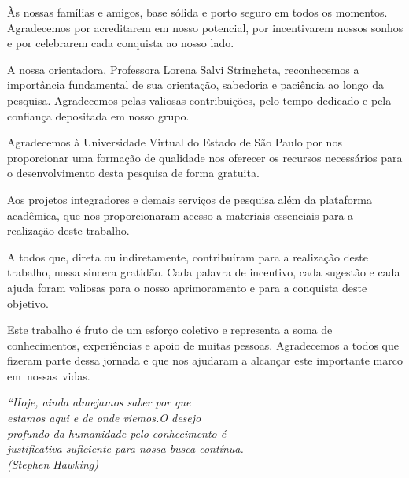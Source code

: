\documentclass[
12pt,
 a4paper,
    english,
    brazil,
    oneside
    ]{abntex2}
\begin{document}
	\begin{agradecimentos}
		Às nossas famílias e amigos, base sólida e porto seguro em todos os momentos. Agradecemos por acreditarem em nosso potencial, por incentivarem nossos sonhos e por celebrarem cada conquista ao nosso lado. 
		
		A nossa orientadora, Professora Lorena Salvi Stringheta, reconhecemos a importância fundamental de sua orientação, sabedoria e paciência ao longo da pesquisa. Agradecemos pelas valiosas contribuições, pelo tempo dedicado e pela confiança depositada em nosso grupo. 
		
		Agradecemos à Universidade Virtual do Estado de São Paulo por nos proporcionar uma formação de qualidade nos oferecer os recursos necessários para o desenvolvimento desta pesquisa de forma gratuita. 
		
		Aos projetos integradores e demais serviços de pesquisa além da plataforma acadêmica, que nos proporcionaram acesso a materiais essenciais para a realização deste trabalho.  
		
		A todos que, direta ou indiretamente, contribuíram para a realização deste trabalho, nossa sincera gratidão. Cada palavra de incentivo, cada sugestão e cada ajuda foram valiosas para o nosso aprimoramento e para a conquista deste objetivo. 
		
		Este trabalho é fruto de um esforço coletivo e representa a soma de conhecimentos, experiências e apoio de muitas pessoas. Agradecemos a todos que fizeram parte dessa jornada e que nos ajudaram a alcançar este importante marco em nossas vidas.
	\end{agradecimentos}
	
	\begin{epigrafe}
		\vspace*{\fill}
		\begin{flushright}
			\textit{``Hoje, ainda almejamos saber por que\\
				estamos aqui e de onde viemos.O desejo\\
				profundo da humanidade pelo	conhecimento é\\
				justificativa suficiente para nossa busca contínua.\\
				(Stephen Hawking)}
		\end{flushright}
	\end{epigrafe}
	
\end{document}
